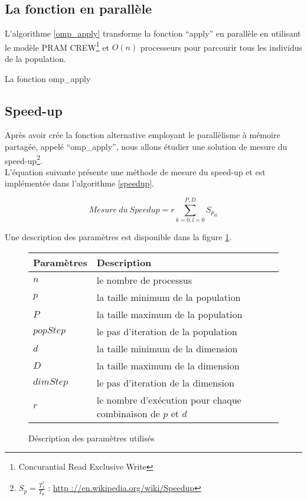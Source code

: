 \subsection{La fonction en parallèle}

L'algorithme \ref{omp_apply} transforme la fonction ``apply'' en parallèle en utilisant le modèle PRAM CREW\footnote{Concurantial Read Exclusive Write} et $O(n)$ processeurs pour parcourir tous les individus de la population.

\incmargin{1em}
\begin{algorithm}[here]
  \dontprintsemicolon
  \label{omp_apply}
  \caption{La fonction omp_apply}
\end{algorithm}

\subsection{Speed-up}

Après avoir crée la fonction alternative employant le parallèlisme à mémoire partagée, appelé ``omp\_apply'', nous allons étudier une solution de mesure du speed-up\footnote{$S_p = \frac{T_1^*}{T_p}$ : \url{http ://en.wikipedia.org/wiki/Speedup}}.\\

L'équation suivante présente une méthode de mesure du speed-up et est implémentée dans l'algorithme \ref{speedup}.

$$Mesure\ du\ Speedup = r \sum^{P,D}_{k=0,l=0} S_{p_{kl}}$$

Une description des paramètres est disponible dans la figure \ref{fig:description_parametres}.

\begin{figure}[here]
  \centering
  \begin{tabular}{ | l | p{7cm} |}
    \hline
    \textbf{Paramètres} & \textbf{Description}\\\hline
    $n$ & le nombre de processus\\\hline
    $p$ & la taille minimum de la population\\\hline
    $P$ & la taille maximum de la population\\\hline
    $popStep$ & le pas d'iteration de la population\\\hline
    $d$ & la taille minimum de la dimension\\\hline
    $D$ & la taille maximum de la dimension\\\hline
    $dimStep$ & le pas d'iteration de la dimension\\\hline
    $r$ & le nombre d'exécution pour chaque combinaison de $p$ et $d$\\\hline
  \end{tabular}
  \caption{Déscription des paramètres utilisés}
  \label{fig:description_parametres}
\end{figure}

